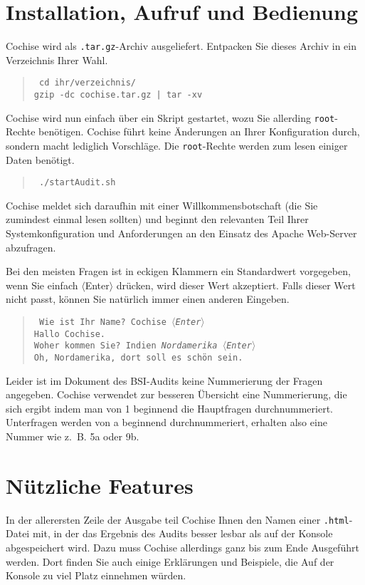 \documentclass{article}
\newenvironment{code}{\begin{quote}\tt}{\end{quote}}
\begin{document}
\section{Installation, Aufruf und Bedienung}
Cochise wird als \texttt{.tar.gz}-Archiv ausgeliefert. Entpacken Sie dieses Archiv in ein Verzeichnis Ihrer Wahl.
\begin{code}
	cd ihr/verzeichnis/\\
	gzip -dc cochise.tar.gz | tar -xv
\end{code}
\par
Cochise wird nun einfach über ein Skript gestartet, wozu Sie allerding \texttt{root}-Rechte benötigen. Cochise führt keine Änderungen
an Ihrer Konfiguration durch, sondern macht lediglich Vorschläge. Die \texttt{root}-Rechte werden zum lesen einiger Daten benötigt.
\begin{code}
	./startAudit.sh
\end{code}
Cochise meldet sich daraufhin mit einer Willkommensbotschaft (die Sie zumindest einmal lesen sollten) und beginnt den relevanten Teil Ihrer
Systemkonfiguration und Anforderungen an den Einsatz des Apache Web-Server abzufragen.
\par
Bei den meisten Fragen ist in eckigen Klammern ein Standardwert vorgegeben, wenn Sie einfach \textsf{\small$\langle$Enter$\rangle$} drücken,
wird dieser Wert akzeptiert. Falls dieser Wert nicht passt, können Sie natürlich immer einen anderen Eingeben.
\begin{code}
	Wie ist Ihr Name? \lbrack Cochise\rbrack \emph{ \textsf{\small$\langle$Enter$\rangle$}}\\
	Hallo Cochise.\\
	Woher kommen Sie? \lbrack Indien\rbrack \emph{ Nordamerika \textsf{\small$\langle$Enter$\rangle$}}\\
	Oh, Nordamerika, dort soll es schön sein.
\end{code}
\par
Leider ist im Dokument des BSI-Audits keine Nummerierung der Fragen angegeben. Cochise verwendet zur besseren Übersicht eine Nummerierung,
die sich ergibt indem man von 1 beginnend die Hauptfragen durchnummeriert. Unterfragen werden von \textsf{a} beginnend durchnummeriert,
erhalten also eine Nummer wie z.~B. \textsf{5a} oder \textsf{9b}.

\section{Nützliche Features}

In der allerersten Zeile der Ausgabe teil Cochise Ihnen den Namen einer \texttt{.html}-Datei mit, in der das Ergebnis des Audits besser
lesbar als auf der Konsole abgespeichert wird. Dazu muss Cochise allerdings ganz bis zum Ende Ausgeführt werden. Dort finden Sie auch einige
Erklärungen und Beispiele, die Auf der Konsole zu viel Platz einnehmen würden.
\end{document}

